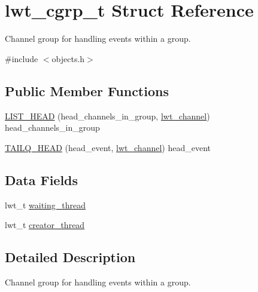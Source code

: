 \hypertarget{structlwt__cgrp}{\section{lwt\+\_\+cgrp\+\_\+t Struct Reference}
\label{structlwt__cgrp}
}


Channel group for handling events within a group.  




{\ttfamily \#include $<$objects.\+h$>$}

\subsection*{Public Member Functions}
\begin{DoxyCompactItemize}
\item 
\hyperlink{structlwt__cgrp_a9e64fc8426379432c84b71b3ebb5a265}{L\+I\+S\+T\+\_\+\+H\+E\+A\+D} (head\+\_\+channels\+\_\+in\+\_\+group, \hyperlink{structlwt__channel}{lwt\+\_\+channel}) head\+\_\+channels\+\_\+in\+\_\+group
\item 
\hyperlink{structlwt__cgrp_aaf2977059a823baa00c6e12b32e5690b}{T\+A\+I\+L\+Q\+\_\+\+H\+E\+A\+D} (head\+\_\+event, \hyperlink{structlwt__channel}{lwt\+\_\+channel}) head\+\_\+event
\end{DoxyCompactItemize}
\subsection*{Data Fields}
\begin{DoxyCompactItemize}
\item 
lwt\+\_\+t \hyperlink{structlwt__cgrp_ac77ed0ee0cf31bd27b995749f819c32b}{waiting\+\_\+thread}
\item 
lwt\+\_\+t \hyperlink{structlwt__cgrp_af86699c56fb03f7a348fa606510af33b}{creator\+\_\+thread}
\end{DoxyCompactItemize}


\subsection{Detailed Description}
Channel group for handling events within a group. 

